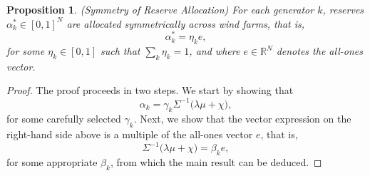 \documentclass{article}
\newtheorem{proposition}{Proposition}
\begin{document}
\begin{proposition}\label{reserveallocation}
(Symmetry of Reserve Allocation) For each generator $k$, reserves $\alpha_k^* \in [0, 1]^N$ are allocated symmetrically across wind farms, that is,
\begin{equation*}
\alpha_{k}^* = \eta_k e,
\end{equation*}
for some $\eta_k \in [0, 1]$ such that $\sum_k \eta_k = 1$, and where $e \in \mathbb{R}^N$ denotes the all-ones vector.
\end{proposition}
\begin{proof}
The proof proceeds in two steps. We start by showing that
\begin{equation*}
\alpha_k = \gamma_k \Sigma^{-1} \Big(\lambda \mu + \chi \Big),
\end{equation*}
for some carefully selected $\gamma_k$. Next, we show that the vector expression on the right-hand side above is a multiple of the all-ones vector $e$, that is,
\begin{equation*}
\Sigma^{-1} \Big(\lambda \mu + \chi \Big) = \beta_k e,
\end{equation*}
for some appropriate $\beta_k$, from which the main result can be deduced.


\end{proof}
\end{document}
